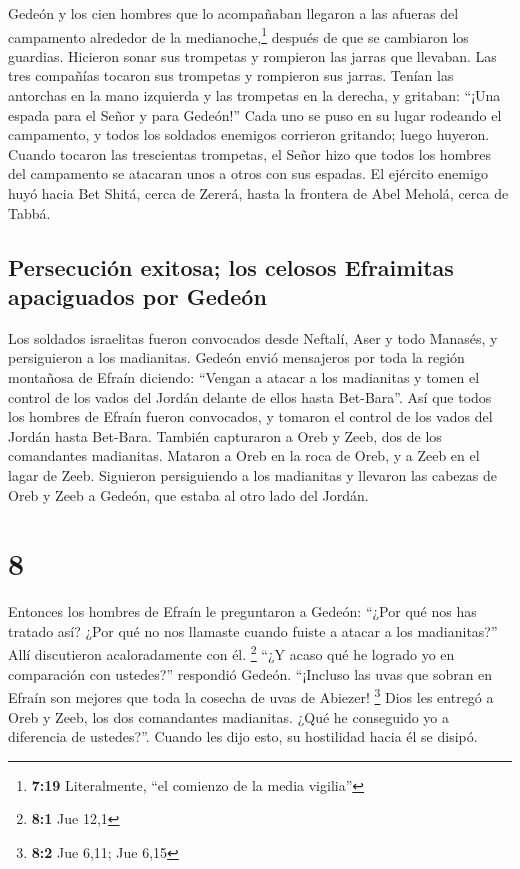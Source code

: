  Gedeón y los cien hombres que lo acompañaban llegaron a
las afueras del campamento alrededor de la medianoche,\footnote{\textbf{7:19}
  Literalmente, ``el comienzo de la media vigilia''} después de que se
cambiaron los guardias. Hicieron sonar sus trompetas y rompieron las
jarras que llevaban.  Las tres compañías tocaron sus
trompetas y rompieron sus jarras. Tenían las antorchas en la mano
izquierda y las trompetas en la derecha, y gritaban: ``¡Una espada para
el Señor y para Gedeón!''  Cada uno se puso en su lugar
rodeando el campamento, y todos los soldados enemigos corrieron
gritando; luego huyeron.  Cuando tocaron las trescientas
trompetas, el Señor hizo que todos los hombres del campamento se
atacaran unos a otros con sus espadas. El ejército enemigo huyó hacia
Bet Shitá, cerca de Zererá, hasta la frontera de Abel Meholá, cerca de
Tabbá.

\hypertarget{persecuciuxf3n-exitosa-los-celosos-efraimitas-apaciguados-por-gedeuxf3n}{%
\subsection{Persecución exitosa; los celosos Efraimitas apaciguados por
Gedeón}\label{persecuciuxf3n-exitosa-los-celosos-efraimitas-apaciguados-por-gedeuxf3n}}

 Los soldados israelitas fueron convocados desde Neftalí,
Aser y todo Manasés, y persiguieron a los madianitas. 
Gedeón envió mensajeros por toda la región montañosa de Efraín diciendo:
``Vengan a atacar a los madianitas y tomen el control de los vados del
Jordán delante de ellos hasta Bet-Bara''. Así que todos los hombres de
Efraín fueron convocados, y tomaron el control de los vados del Jordán
hasta Bet-Bara.  También capturaron a Oreb y Zeeb, dos de
los comandantes madianitas. Mataron a Oreb en la roca de Oreb, y a Zeeb
en el lagar de Zeeb. Siguieron persiguiendo a los madianitas y llevaron
las cabezas de Oreb y Zeeb a Gedeón, que estaba al otro lado del Jordán.

\hypertarget{section-7}{%
\section{8}\label{section-7}}

 Entonces los hombres de Efraín le preguntaron a Gedeón:
``¿Por qué nos has tratado así? ¿Por qué no nos llamaste cuando fuiste a
atacar a los madianitas?'' Allí discutieron acaloradamente con él.
\footnote{\textbf{8:1} Jue 12,1}  ``¿Y acaso qué he
logrado yo en comparación con ustedes?'' respondió Gedeón. ``¡Incluso
las uvas que sobran en Efraín son mejores que toda la cosecha de uvas de
Abiezer! \footnote{\textbf{8:2} Jue 6,11; Jue 6,15}  Dios
les entregó a Oreb y Zeeb, los dos comandantes madianitas. ¿Qué he
conseguido yo a diferencia de ustedes?''. Cuando les dijo esto, su
hostilidad hacia él se disipó.

